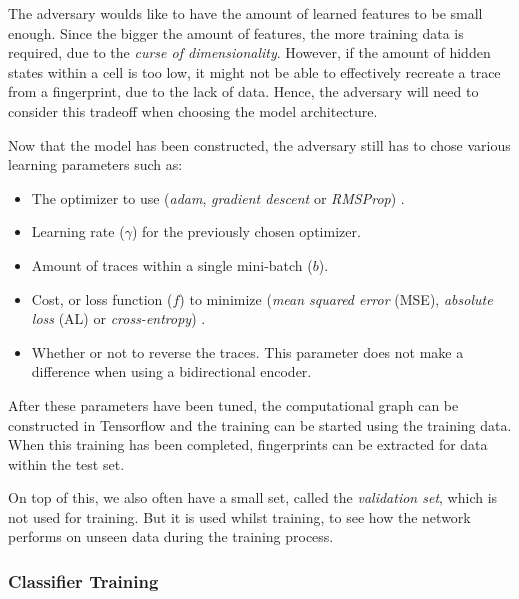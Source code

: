 The adversary woulds like to have the amount of learned features to be small enough.
Since the bigger the amount of features, the more training data is required, due to the \textit{curse of dimensionality}.
However, if the amount of hidden states within a cell is too low, it might not be able to effectively recreate a trace from a fingerprint, due to the lack of data.
Hence, the adversary will need to consider this tradeoff when choosing the model architecture.

Now that the model has been constructed, the adversary still has to chose various learning parameters such as:

\begin{itemize}
  \item The optimizer to use (\textit{adam}, \textit{gradient descent} or \textit{RMSProp}) \cite{tensorflow}.
  \item Learning rate ($\gamma$) for the previously chosen optimizer.
  \item Amount of traces within a single mini-batch ($b$).
  \item Cost, or loss function ($f$) to minimize (\textit{mean squared error} (MSE), \textit{absolute loss} (AL) or \textit{cross-entropy}) \cite{tensorflow}.
  \item Whether or not to reverse the traces. This parameter does not make a difference when using a bidirectional encoder.
\end{itemize}

After these parameters have been tuned, the computational graph can be constructed in Tensorflow and the training can be started using the training data.
When this training has been completed, fingerprints can be extracted for data within the test set.

On top of this, we also often have a small set, called the \textit{validation set}, which is not used for training.
But it is used whilst training, to see how the network performs on unseen data during the training process.

\subsubsection{Classifier Training}

